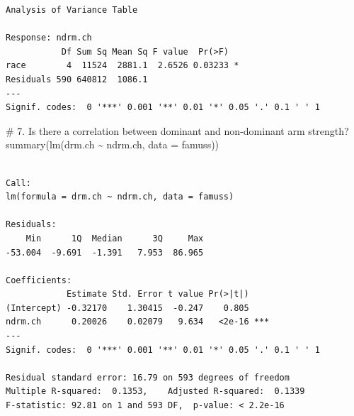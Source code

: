 \documentclass[
  letterpaper,
  DIV=11,
  numbers=noendperiod,
  oneside]{scrreprt}
\newenvironment{Shaded}{\begin{snugshade}}{\end{snugshade}}
\newcommand{\AttributeTok}[1]{\textcolor[rgb]{0.40,0.45,0.13}{#1}}
\newcommand{\CommentTok}[1]{\textcolor[rgb]{0.37,0.37,0.37}{#1}}
\newcommand{\FunctionTok}[1]{\textcolor[rgb]{0.28,0.35,0.67}{#1}}
\newcommand{\NormalTok}[1]{\textcolor[rgb]{0.00,0.23,0.31}{#1}}
\newcommand{\SpecialCharTok}[1]{\textcolor[rgb]{0.37,0.37,0.37}{#1}}
\begin{document}
\begin{verbatim}
Analysis of Variance Table

Response: ndrm.ch
           Df Sum Sq Mean Sq F value  Pr(>F)  
race        4  11524  2881.1  2.6526 0.03233 *
Residuals 590 640812  1086.1                  
---
Signif. codes:  0 '***' 0.001 '**' 0.01 '*' 0.05 '.' 0.1 ' ' 1
\end{verbatim}

\begin{Shaded}
\begin{Highlighting}[]
\CommentTok{\# 7. Is there a correlation between dominant and non{-}dominant arm strength?}
\FunctionTok{summary}\NormalTok{(}\FunctionTok{lm}\NormalTok{(drm.ch }\SpecialCharTok{\textasciitilde{}}\NormalTok{ ndrm.ch, }\AttributeTok{data =}\NormalTok{ famuss))}
\end{Highlighting}
\end{Shaded}

\begin{verbatim}

Call:
lm(formula = drm.ch ~ ndrm.ch, data = famuss)

Residuals:
    Min      1Q  Median      3Q     Max 
-53.004  -9.691  -1.391   7.953  86.965 

Coefficients:
            Estimate Std. Error t value Pr(>|t|)    
(Intercept) -0.32170    1.30415  -0.247    0.805    
ndrm.ch      0.20026    0.02079   9.634   <2e-16 ***
---
Signif. codes:  0 '***' 0.001 '**' 0.01 '*' 0.05 '.' 0.1 ' ' 1

Residual standard error: 16.79 on 593 degrees of freedom
Multiple R-squared:  0.1353,    Adjusted R-squared:  0.1339 
F-statistic: 92.81 on 1 and 593 DF,  p-value: < 2.2e-16
\end{verbatim}
\end{document}
